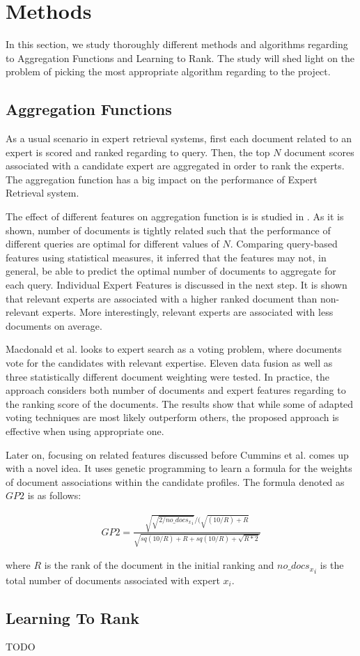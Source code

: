 \section{Methods}
\label{sec:methods}
In this section, we study thoroughly different methods and algorithms regarding to Aggregation Functions and Learning to Rank. The study will shed light on the problem of picking the most appropriate algorithm regarding to the project.

\subsection{Aggregation Functions}
As a usual scenario in expert retrieval systems, first each document related to an expert is scored and ranked regarding to query. Then, the top $N$ document scores associated with a candidate expert are aggregated in order to rank the experts. The aggregation function has a big impact on the performance of Expert Retrieval system.

The effect of different features on aggregation function is is studied in \cite{agg-gp2}. As it is shown, number of documents is tightly related such that the performance of different queries are optimal for different values of $N$. Comparing query-based features using statistical measures, it inferred that the features may not, in general, be able to predict the optimal number of documents to aggregate for each query. Individual Expert Features is discussed in the next step. It is shown that relevant experts are associated with a higher ranked document than non-relevant experts. More interestingly, relevant experts are associated with less documents on average.

Macdonald et al.\cite{agg-vote} looks to expert search as a voting problem, where documents vote for the candidates with relevant expertise. Eleven data fusion as well as three statistically different document weighting were tested. In practice, the approach considers both number of documents and expert features regarding to the ranking score of the documents. The results show that while some of adapted voting techniques are most likely outperform others, the proposed approach is effective when using appropriate one.

Later on, focusing on related features discussed before Cummins et al.\cite{agg-gp2} comes up with a novel idea. It uses genetic programming to learn a formula for the weights of document associations within the candidate profiles. The formula denoted as $GP2$ is as follows:

\begin{align*}
GP2 = \frac{\sqrt{\sqrt{2/{no\_docs_x}_i}}/(\sqrt{(10/R)+R}}{\sqrt{sq(10/R)+R+sq(10/R)+\sqrt{R*2}}}
\end{align*}

\noindent 
where $R$ is the rank of the document in the initial ranking and ${no\_docs_x}_i$ is the total number of documents associated with expert $x_i$.

\subsection{Learning To Rank}
TODO
